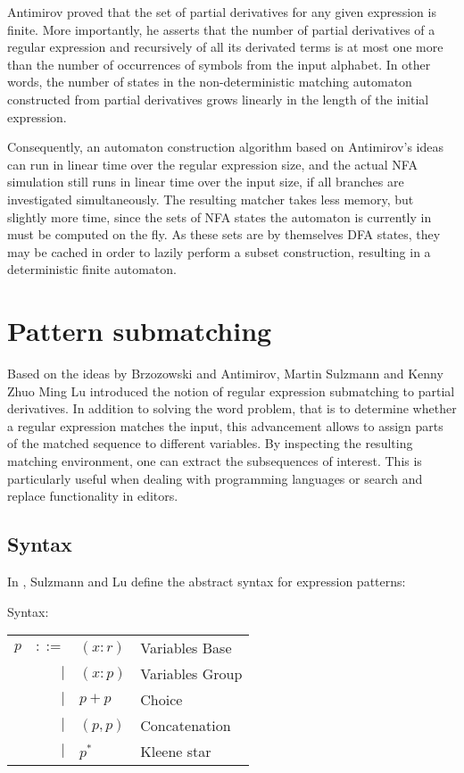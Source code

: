 Antimirov proved that the set of partial derivatives for any given expression is
finite. More importantly, he asserts that the number of partial derivatives of a
regular expression and recursively of all its derivated terms is at most one
more than the number of occurrences of symbols from the input alphabet. In other
words, the number of states in the non-deterministic matching automaton
constructed from partial derivatives grows linearly in the length of the initial
expression.

Consequently, an automaton construction algorithm based on Antimirov's ideas can
run in linear time over the regular expression size, and the actual NFA
simulation still runs in linear time over the input size, if all branches are
investigated simultaneously. The resulting matcher takes less memory, but
slightly more time, since the sets of NFA states the automaton is currently in
must be computed on the fly. As these sets are by themselves DFA states, they
may be cached in order to lazily perform a subset construction, resulting in a
deterministic finite automaton.


\section{Pattern submatching}

Based on the ideas by Brzozowski and Antimirov, Martin Sulzmann and Kenny Zhuo
Ming Lu introduced the notion of regular expression submatching to partial
derivatives. In addition to solving the word problem, that is to determine
whether a regular expression matches the input, this advancement allows to
assign parts of the matched sequence to different variables. By inspecting the
resulting matching environment, one can extract the subsequences of interest.
This is particularly useful when dealing with programming languages or search
and replace functionality in editors.

\subsection{Syntax}

In \cite{pdpat}, Sulzmann and Lu define the abstract syntax for expression
patterns:

\begin{defn}
   \label{defn-pat}
   Syntax:

   \begin{tabular}{lrll}
      $p$	& $::=$	& $(x:r)$	& Variables Base	\\
		& $|$	& $(x:p)$	& Variables Group	\\
		& $|$	& $p+p$		& Choice		\\
		& $|$	& $(p,p)$	& Concatenation		\\
		& $|$	& $p^*$		& Kleene star		\\
   \end{tabular}
\end{defn}

